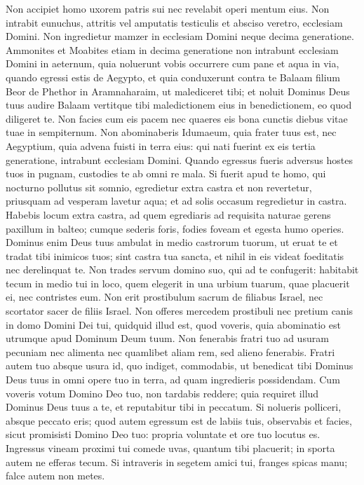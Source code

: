 \begin{biblechapter} 
\verse Non accipiet homo uxorem patris sui nec revelabit operi mentum eius. 
\verse Non intrabit eunuchus, attritis vel amputatis testiculis et absciso veretro, ecclesiam Domini. 
\verse Non ingredietur mamzer in ecclesiam Domini neque decima generatione. 
\verse Ammonites et Moabites etiam in decima generatione non intrabunt ecclesiam Domini in aeternum, 
\verse quia noluerunt vobis occurrere cum pane et aqua in via, quando egressi estis de Aegypto, et quia conduxerunt contra te Balaam filium Beor de Phethor in Aramnaharaim, ut malediceret tibi; 
\verse et noluit Dominus Deus tuus audire Balaam vertitque tibi maledictionem eius in benedictionem, eo quod diligeret te. 
\verse Non facies cum eis pacem nec quaeres eis bona cunctis diebus vitae tuae in sempiternum. 
\verse Non abominaberis Idumaeum, quia frater tuus est, nec Aegyptium, quia advena fuisti in terra eius: 
\verse qui nati fuerint ex eis tertia generatione, intrabunt ecclesiam Domini. 
\verse Quando egressus fueris adversus hostes tuos in pugnam, custodies te ab omni re mala. 
\verse Si fuerit apud te homo, qui nocturno pollutus sit somnio, egredietur extra castra et non revertetur, 
\verse priusquam ad vesperam lavetur aqua; et ad solis occasum regredietur in castra. 
\verse Habebis locum extra castra, ad quem egrediaris ad requisita naturae 
\verse gerens paxillum in balteo; cumque sederis foris, fodies foveam et egesta humo operies. 
\verse Dominus enim Deus tuus ambulat in medio castrorum tuorum, ut eruat te et tradat tibi inimicos tuos; sint castra tua sancta, et nihil in eis videat foeditatis nec derelinquat te. 
\verse Non trades servum domino suo, qui ad te confugerit: 
\verse habitabit tecum in medio tui in loco, quem elegerit in una urbium tuarum, quae placuerit ei, nec contristes eum. 
\verse Non erit prostibulum sacrum de filiabus Israel, nec scortator sacer de filiis Israel. 
\verse Non offeres mercedem prostibuli nec pretium canis in domo Domini Dei tui, quidquid illud est, quod voveris, quia abominatio est utrumque apud Dominum Deum tuum. 
\verse Non fenerabis fratri tuo ad usuram pecuniam nec alimenta nec quamlibet aliam rem, 
\verse sed alieno fenerabis. Fratri autem tuo absque usura id, quo indiget, commodabis, ut benedicat tibi Dominus Deus tuus in omni opere tuo in terra, ad quam ingredieris possidendam. 
\verse Cum voveris votum Domino Deo tuo, non tardabis reddere; quia requiret illud Dominus Deus tuus a te, et reputabitur tibi in peccatum. 
\verse Si nolueris polliceri, absque peccato eris; 
\verse quod autem egressum est de labiis tuis, observabis et facies, sicut promisisti Domino Deo tuo: propria voluntate et ore tuo locutus es. 
\verse Ingressus vineam proximi tui comede uvas, quantum tibi placuerit; in sporta autem ne efferas tecum. 
\verse Si intraveris in segetem amici tui, franges spicas manu; falce autem non metes. 
\end{biblechapter}

